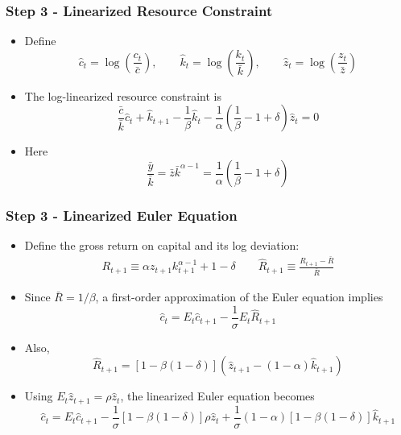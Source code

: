 \documentclass{beamer}
\begin{document}
\begin{frame}
\frametitle{Step 3 - Linearized Resource Constraint}

\begin{itemize}
\item Define
\begin{equation*}
\hat c_t = \log\left(\frac{c_t}{\bar c}\right),
\qquad
\hat k_t = \log\left(\frac{k_t}{\bar k}\right),
\qquad
\hat z_t = \log\left(\frac{z_t}{\bar z}\right)
\end{equation*}
\item The log-linearized resource constraint is
\begin{equation}\tag{RC-LIN}\label{eq:rc_lin}
\frac{\bar c}{\bar k}\hat c_t + \hat k_{t+1}
- \frac{1}{\beta}\hat k_t
- \frac{1}{\alpha}\left(\frac{1}{\beta}-1+\delta\right)\hat z_t
= 0
\end{equation}
\item Here
\begin{equation*}
\frac{\bar y}{\bar k} = \bar z \bar k^{\alpha-1}
= \frac{1}{\alpha}\left(\frac{1}{\beta}-1+\delta\right)
\end{equation*}
\end{itemize}

\end{frame}

\begin{frame}
\frametitle{Step 3 - Linearized Euler Equation}
\begin{itemize}
\item Define the gross return on capital and its log deviation:
\begin{equation*}
\begin{aligned}
R_{t+1} \equiv \alpha z_{t+1}k_{t+1}^{\alpha-1}+1-\delta
\qquad
\hat R_{t+1} \equiv \frac{R_{t+1}-\bar R}{\bar R}
\end{aligned}
\end{equation*}
\item Since $\bar R = 1/\beta$, a first-order approximation of the Euler equation implies
\begin{equation}
\hat c_t = E_t \hat c_{t+1} - \frac{1}{\sigma} E_t \hat R_{t+1}
\end{equation}
\item Also,
\begin{equation}
\hat R_{t+1}
=
\left[1-\beta(1-\delta)\right]
\left(\hat z_{t+1}-(1-\alpha)\hat k_{t+1}\right)
\end{equation}
\item Using $E_t \hat z_{t+1}=\rho \hat z_t$, the linearized Euler equation becomes
\small
\begin{equation}\tag{EE-LIN}\label{eq:ee_lin}
\hat c_t = E_t\hat c_{t+1} - \frac{1}{\sigma}\left[1-\beta(1-\delta)\right]\rho \hat z_t + \frac{1}{\sigma}(1-\alpha)\left[1-\beta(1-\delta)\right]\hat k_{t+1}
\end{equation}
\normalsize
\end{itemize}

\end{frame}
\end{document}

